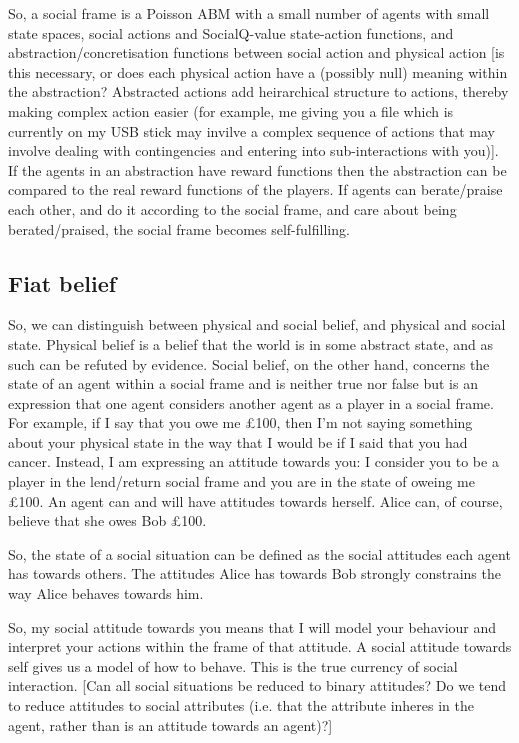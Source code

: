 \documentclass[a4paper]{article}
\begin{document}
So, a social frame is a Poisson ABM with a small number of agents with small state spaces, social actions and SocialQ-value state-action functions, and abstraction/concretisation functions between social action and physical action [is this necessary, or does each physical action have a (possibly null) meaning within the abstraction? Abstracted actions add heirarchical structure to actions, thereby making complex action easier (for example, me giving you a file which is currently on my USB stick may invilve a complex sequence of actions that may involve dealing with contingencies and entering into sub-interactions with you)]. If the agents in an abstraction have reward functions then the abstraction can be compared to the real reward functions of the players. If agents can berate/praise each other, and do it according to the social frame, and care about being berated/praised, the social frame becomes self-fulfilling.

\subsection{Fiat belief}

So, we can distinguish between physical and social belief, and physical and social state. Physical belief is a belief that the world is in some abstract state, and as such can be refuted by evidence. Social belief, on the other hand, concerns the state of an agent within a social frame and is neither true nor false but is an expression that one agent considers another agent as a player in a social frame. For example, if I say that you owe me £100, then I'm not saying something about your physical state in the way that I would be if I said that you had cancer. Instead, I am expressing an attitude towards you: I consider you to be a player in the lend/return social frame and you are in the state of oweing me £100. An agent can and will have attitudes towards herself. Alice can, of course, believe that she owes Bob £100.

So, the state of a social situation can be defined as the social attitudes each agent has towards others. The attitudes Alice has towards Bob strongly constrains the way Alice behaves towards him.

So, my social attitude towards you means that I will model your behaviour and interpret your actions within the frame of that attitude. A social attitude towards self gives us a model of how to behave. This is the true currency of social interaction. [Can all social situations be reduced to binary attitudes? Do we tend to reduce attitudes to social attributes (i.e. that the attribute inheres in the agent, rather than is an attitude towards an agent)?]
\end{document}
